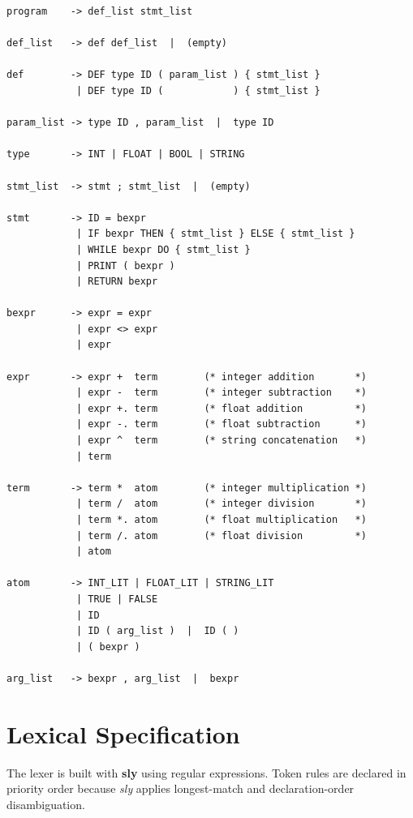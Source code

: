 \documentclass[12pt,a4paper]{report}
\begin{document}
\begin{lstlisting}[style=tacstyle, numbers=none,
  caption={Complete grammar of PL (BNF notation).}]
program    -> def_list stmt_list

def_list   -> def def_list  |  (empty)

def        -> DEF type ID ( param_list ) { stmt_list }
            | DEF type ID (            ) { stmt_list }

param_list -> type ID , param_list  |  type ID

type       -> INT | FLOAT | BOOL | STRING

stmt_list  -> stmt ; stmt_list  |  (empty)

stmt       -> ID = bexpr
            | IF bexpr THEN { stmt_list } ELSE { stmt_list }
            | WHILE bexpr DO { stmt_list }
            | PRINT ( bexpr )
            | RETURN bexpr

bexpr      -> expr = expr
            | expr <> expr
            | expr

expr       -> expr +  term        (* integer addition       *)
            | expr -  term        (* integer subtraction    *)
            | expr +. term        (* float addition         *)
            | expr -. term        (* float subtraction      *)
            | expr ^  term        (* string concatenation   *)
            | term

term       -> term *  atom        (* integer multiplication *)
            | term /  atom        (* integer division       *)
            | term *. atom        (* float multiplication   *)
            | term /. atom        (* float division         *)
            | atom

atom       -> INT_LIT | FLOAT_LIT | STRING_LIT
            | TRUE | FALSE
            | ID
            | ID ( arg_list )  |  ID ( )
            | ( bexpr )

arg_list   -> bexpr , arg_list  |  bexpr
\end{lstlisting}

\section{Lexical Specification}

The lexer is built with \textbf{sly} using regular expressions. Token rules
are declared in priority order because \textit{sly} applies longest-match and
declaration-order disambiguation.
\end{document}
